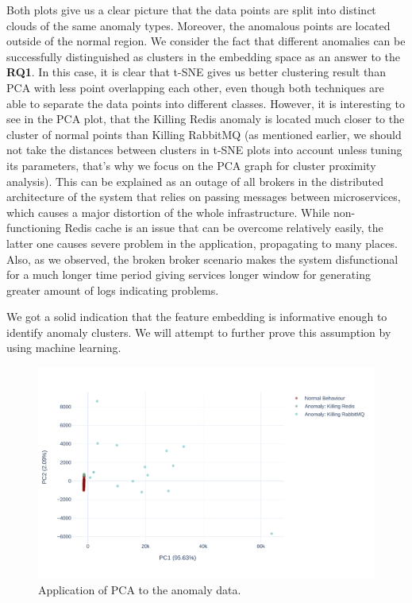 Both plots give us a clear picture that the data points are split into distinct clouds of the same anomaly types. Moreover, the anomalous points are located outside of the normal region. We consider the fact that different anomalies can be successfully distinguished as clusters in the embedding space as an answer to the \textbf{RQ1}. In this case, it is clear that t-SNE gives us better clustering result than PCA with less point overlapping each other, even though both techniques are able to separate the data points into different classes. However, it is interesting to see in the PCA plot, that the Killing Redis anomaly is located much closer to the cluster of normal points than Killing RabbitMQ (as mentioned earlier, we should not take the distances between clusters in t-SNE plots into account unless tuning its parameters, that's why we focus on the PCA graph for cluster proximity analysis). This can be explained as an outage of all brokers in the distributed architecture of the system that relies on passing messages between microservices, which causes a major distortion of the whole infrastructure. 
While non-functioning Redis cache is an issue that can be overcome relatively easily, the latter one causes severe problem in the application, propagating to many places. Also, as we observed, the broken broker scenario makes the system disfunctional for a much longer time period giving services longer window for generating greater amount of logs indicating problems.

We got a solid indication that the feature embedding is informative enough to identify anomaly clusters. We will attempt to further prove this assumption by using machine learning.

\begin{figure}[!h]
    \centering
    \includegraphics[width=\textwidth]{img/pca-anomalies-vs-normal.pdf}
    \caption{Application of PCA to the anomaly data.}
    \label{fig:pca-anomalies}
\end{figure}

